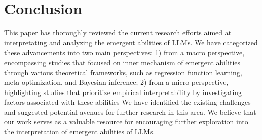 \documentclass[11pt,a4paper]{article}
\begin{document}









\section{Conclusion}
This paper has thoroughly reviewed the current research efforts aimed at interpretating and analyzing the emergent abilities of LLMs.
We have categorized these advancements into two main perspectives: 1) from a macro perspective, encompassing studies that focused on inner mechanism of emergent abilities through various theoretical frameworks, such as regression function learning, meta-optimization, and Bayesian inference;
2) from a micro perspective, highlighting studies that prioritize empirical interpretability by investigating factors associated with these abilities
We have identified the existing challenges and suggested potential avenues for further research in this area.
We believe that our work serves as a valuable resource for encouraging further exploration into the interpretation of emergent abilities of LLMs.




\end{document}
